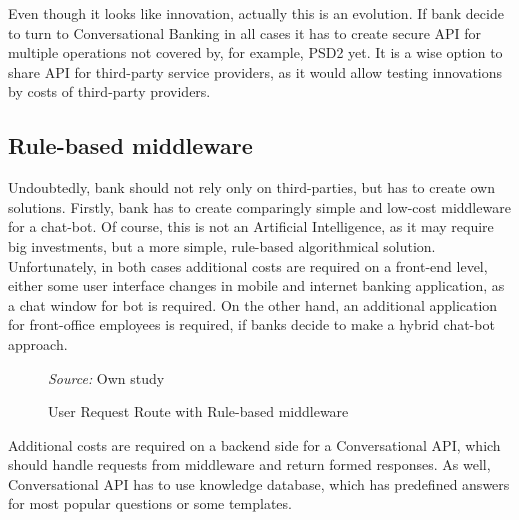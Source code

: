 Even though it looks like innovation, actually this is an evolution.
If bank decide to turn to Conversational Banking in all cases it has to create secure API for multiple operations not covered by, for example, PSD2 yet.
It is a wise option to share API for third-party service providers, as it would allow testing innovations by costs of third-party providers.


\subsection{Rule-based middleware}

Undoubtedly, bank should not rely only on third-parties, but has to create own solutions.
Firstly, bank has to create comparingly simple and low-cost middleware for a chat-bot.
Of course, this is not an Artificial Intelligence, as it may require big investments, but a more simple, rule-based algorithmical solution.
Unfortunately, in both cases additional costs are required on a front-end level, either some user interface changes in mobile and internet banking application, as a chat window for bot is required.
On the other hand, an additional application for front-office employees is required, if banks decide to make a hybrid chat-bot approach.

\begin{figure}
    \centering
    \caption{User Request Route with Rule-based middleware}
    \medskip
    \footnotesize\textit{Source:} Own study
\end{figure}

Additional costs are required on a backend side for a Conversational API, which should handle requests from middleware and return formed responses.
As well, Conversational API has to use knowledge database, which has predefined answers for most popular questions or some templates.


